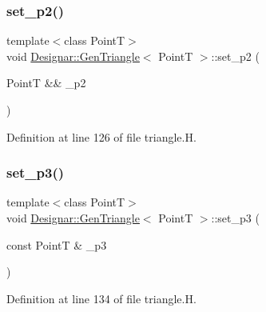 \subsubsection{\texorpdfstring{set\+\_\+p2()}{set\_p2()}\hspace{0.1cm}{\footnotesize\ttfamily [2/2]}}
{\footnotesize\ttfamily template$<$class PointT$>$ \\
void \hyperlink{class_designar_1_1_gen_triangle}{Designar\+::\+Gen\+Triangle}$<$ PointT $>$\+::set\+\_\+p2 (\begin{DoxyParamCaption}\item[{PointT \&\&}]{\+\_\+p2 }\end{DoxyParamCaption})\hspace{0.3cm}{\ttfamily [inline]}}



Definition at line 126 of file triangle.\+H.

\mbox{\label{class_designar_1_1_gen_triangle_a2bb761ccf1029ca9118b9ae2fe924eab}} 
\subsubsection{\texorpdfstring{set\+\_\+p3()}{set\_p3()}\hspace{0.1cm}{\footnotesize\ttfamily [1/2]}}
{\footnotesize\ttfamily template$<$class PointT$>$ \\
void \hyperlink{class_designar_1_1_gen_triangle}{Designar\+::\+Gen\+Triangle}$<$ PointT $>$\+::set\+\_\+p3 (\begin{DoxyParamCaption}\item[{const PointT \&}]{\+\_\+p3 }\end{DoxyParamCaption})\hspace{0.3cm}{\ttfamily [inline]}}



Definition at line 134 of file triangle.\+H.

\mbox{\label{class_designar_1_1_gen_triangle_ae5223087afc26fef8eea9f494fb2d770}} 
